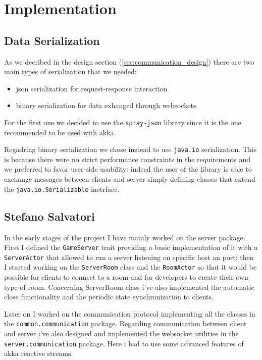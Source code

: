 \chapter{Implementation}
\section{Data Serialization}
As we decribed in the design section (\ref{sec:communication_design}) there are two main types of serialization that we needed:
\begin{itemize}
	\item json serialization for request-response interaction
	\item binary serialization for  data exhanged through websockets
\end{itemize}

For the first one we decided to use the \texttt{spray-json} library since it is the one recommended to be used with akka.

Regadring binary serialization we chose instead to use \texttt{java.io} serialization. This is because there were no strict performance constraints in the requirements and we preferred to favor user-side usability: indeed the user of the library is able to exchange messages between clients and server simply defining classes that extend the \texttt{java.io.Serializable} inetrface.



\section{Stefano Salvatori}
In the early stages of the project I have mainly worked on the server package. First I defined the \texttt{GameServer} trait providing a basic implementation of it with a \texttt{ServerActor} that allowed to run a server listening on specific host an port; then I started working on the \texttt{ServerRoom} class and the \texttt{RoomActor} so that it would be possible for clients to connect to a room and for developers to create their own type of room. Concerning ServerRoom class i've also implemented the automatic close functionality and the periodic state synchronization to clients.

Later on I worked on the communication protocol implementing all the classes in the \texttt{common.communication} package. Regarding communication between client and server i've also designed and implemented the websocket utilities in the \texttt{server.communication} package. Here i had to use some advanced features of akka reactive streams. 

